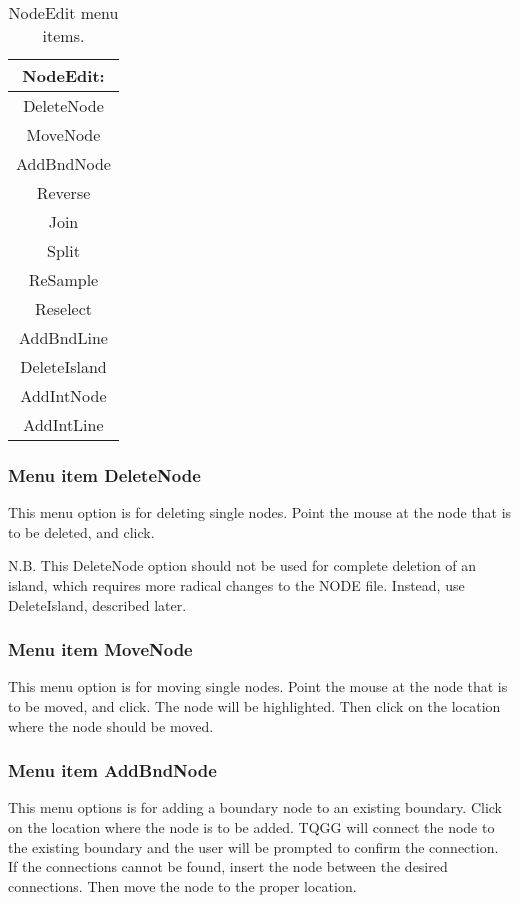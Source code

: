 \documentclass{article}
\begin{document}
\begin{table}[htb!]
 \caption{NodeEdit menu items.}
  \begin{center}
   \begin{tabular}{|c|}
    \hline
NodeEdit:\\     \hline
DeleteNode \\ MoveNode \\     \hline
AddBndNode \\ Reverse \\ Join \\ Split \\ ReSample \\ Reselect \\ AddBndLine \\ DeleteIsland \\     \hline
AddIntNode \\ AddIntLine \\   
    \hline
   \end{tabular}
   \label{tab:NODEEDIT}
  \end{center}
\end{table}

\subsubsection[Menu item DeleteNode]{Menu item DeleteNode}
This menu option is for deleting single nodes. Point the mouse at the node that is to be deleted, and click.

N.B. This DeleteNode option should not be used for complete deletion of an island, which requires more radical changes to the NODE file. Instead, use DeleteIsland, described later.

\subsubsection[Menu item MoveNode]{Menu item MoveNode}
This menu option is for moving single nodes. Point the mouse at the node that is to be moved, and click. The node will be highlighted. Then click on the location where the node should be moved.

\subsubsection[Menu item AddBndNode]{Menu item AddBndNode}
This menu options is for adding a boundary node to an existing boundary. Click on the location where the node is to be added. TQGG will connect the node to the existing boundary and the user will be prompted to confirm the connection. If the connections cannot be found, insert the node between the desired connections. Then move the node to the proper location.
\end{document}
